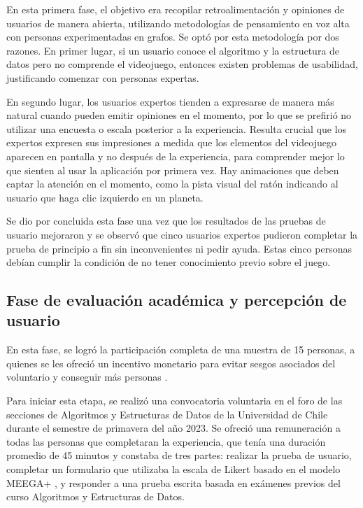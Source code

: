 En esta primera fase, el objetivo era recopilar retroalimentación y opiniones de usuarios de manera abierta, utilizando metodologías de pensamiento en voz alta con personas experimentadas en grafos. Se optó por esta metodología por dos razones. En primer lugar, si un usuario conoce el algoritmo y la estructura de datos pero no comprende el videojuego, entonces existen problemas de usabilidad, justificando comenzar con personas expertas.

En segundo lugar, los usuarios expertos tienden a expresarse de manera más natural cuando pueden emitir opiniones en el momento, por lo que se prefirió no utilizar una encuesta o escala posterior a la experiencia. Resulta crucial que los expertos expresen sus impresiones a medida que los elementos del videojuego aparecen en pantalla y no después de la experiencia, para comprender mejor lo que sienten al usar la aplicación por primera vez. Hay animaciones que deben captar la atención en el momento, como la pista visual del ratón indicando al usuario que haga clic izquierdo en un planeta.

Se dio por concluida esta fase una vez que los resultados de las pruebas de usuario mejoraron y se observó que cinco usuarios expertos pudieron completar la prueba de principio a fin sin inconvenientes ni pedir ayuda. Estas cinco personas debían cumplir la condición de no tener conocimiento previo sobre el juego.

\subsection{Fase de evaluación académica y percepción de usuario}

En esta fase, se logró la participación completa de una muestra de 15 personas, a quienes se les ofreció un incentivo monetario para evitar sesgos asociados del voluntario y conseguir más personas \cite{Marinescu2018IncentivesCR, Dallmeyer2023ToPayOrNot}.

Para iniciar esta etapa, se realizó una convocatoria voluntaria en el foro de las secciones de Algoritmos y Estructuras de Datos de la Universidad de Chile durante el semestre de primavera del año 2023. Se ofreció una remuneración a todas las personas que completaran la experiencia, que tenía una duración promedio de 45 minutos y constaba de tres partes: realizar la prueba de usuario, completar un formulario que utilizaba la escala de Likert basado en el modelo MEEGA+ \cite{meegaplus}, y responder a una prueba escrita basada en exámenes previos del curso Algoritmos y Estructuras de Datos.

